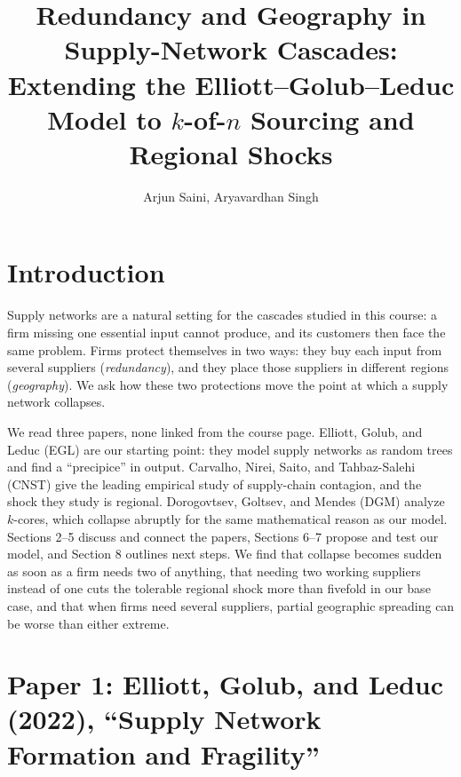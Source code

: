 \documentclass[10pt]{article}
\title{\vspace{-2.2em}\Large\bfseries Redundancy and Geography in Supply-Network Cascades:\\ \large Extending the Elliott--Golub--Leduc Model to $k$-of-$n$ Sourcing and Regional Shocks}
\author{Arjun Saini, Aryavardhan Singh}
\date{}
\begin{document}
\maketitle
\thispagestyle{fancy}
\vspace{-1.6em}

\section{Introduction}
Supply networks are a natural setting for the cascades studied in this course: a firm missing one essential input cannot produce, and its customers then face the same problem. Firms protect themselves in two ways: they buy each input from several suppliers (\emph{redundancy}), and they place those suppliers in different regions (\emph{geography}). We ask how these two protections move the point at which a supply network collapses.

We read three papers, none linked from the course page. Elliott, Golub, and Leduc \cite{egl2022} (EGL) are our starting point: they model supply networks as random trees and find a ``precipice'' in output. Carvalho, Nirei, Saito, and Tahbaz-Salehi \cite{cnst2021} (CNST) give the leading empirical study of supply-chain contagion, and the shock they study is regional. Dorogovtsev, Goltsev, and Mendes \cite{dorogovtsev2006} (DGM) analyze $k$-cores, which collapse abruptly for the same mathematical reason as our model. Sections 2--5 discuss and connect the papers, Sections 6--7 propose and test our model, and Section 8 outlines next steps. We find that collapse becomes sudden as soon as a firm needs two of anything, that needing two working suppliers instead of one cuts the tolerable regional shock more than fivefold in our base case, and that when firms need several suppliers, partial geographic spreading can be worse than either extreme.

\section{Paper 1: Elliott, Golub, and Leduc (2022), ``Supply Network Formation and Fragility''}
\end{document}
